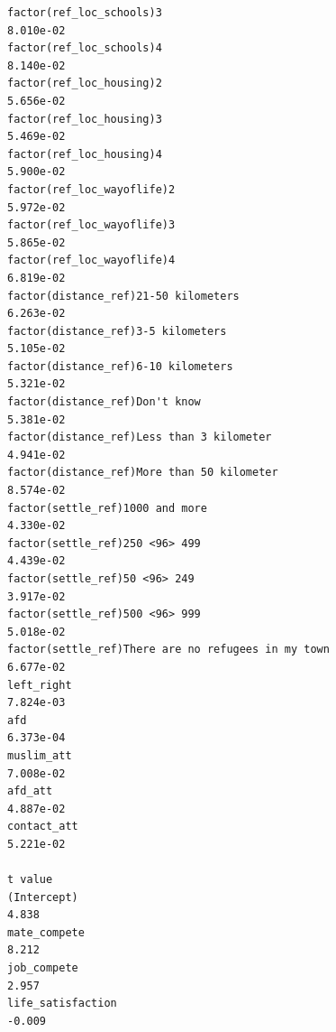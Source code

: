 \documentclass[
]{article}
\begin{document}
\begin{table}
\begin{minipage}[t]{\linewidth}
{\begin{verbatim}
factor(ref_loc_schools)3                                                           8.010e-02
factor(ref_loc_schools)4                                                           8.140e-02
factor(ref_loc_housing)2                                                           5.656e-02
factor(ref_loc_housing)3                                                           5.469e-02
factor(ref_loc_housing)4                                                           5.900e-02
factor(ref_loc_wayoflife)2                                                         5.972e-02
factor(ref_loc_wayoflife)3                                                         5.865e-02
factor(ref_loc_wayoflife)4                                                         6.819e-02
factor(distance_ref)21-50 kilometers                                               6.263e-02
factor(distance_ref)3-5 kilometers                                                 5.105e-02
factor(distance_ref)6-10 kilometers                                                5.321e-02
factor(distance_ref)Don't know                                                     5.381e-02
factor(distance_ref)Less than 3 kilometer                                          4.941e-02
factor(distance_ref)More than 50 kilometer                                         8.574e-02
factor(settle_ref)1000 and more                                                    4.330e-02
factor(settle_ref)250 <96> 499                                                     4.439e-02
factor(settle_ref)50 <96> 249                                                      3.917e-02
factor(settle_ref)500 <96> 999                                                     5.018e-02
factor(settle_ref)There are no refugees in my town                                 6.677e-02
left_right                                                                         7.824e-03
afd                                                                                6.373e-04
muslim_att                                                                         7.008e-02
afd_att                                                                            4.887e-02
contact_att                                                                        5.221e-02
                                                                                  t value
(Intercept)                                                                         4.838
mate_compete                                                                        8.212
job_compete                                                                         2.957
life_satisfaction                                                                  -0.009

\end{verbatim}}
\end{minipage}
\end{table}
\end{document}
